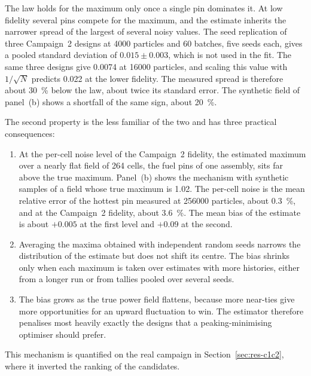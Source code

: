 The law holds for the maximum only once a single pin dominates it. At
low fidelity several pins compete for the maximum, and the estimate
inherits the narrower spread of the largest of several noisy values.
The seed replication of three Campaign~2 designs at \num{4000} particles
and 60 batches, five seeds each, gives a pooled standard deviation of
$0.015 \pm 0.003$, which is not used in the fit. The same three designs
give 0.0074 at \num{16000} particles, and scaling this value with
$1/\sqrt{N}$ predicts 0.022 at the lower fidelity. The measured spread is
therefore about \SI{30}{\percent} below the law, about twice its
standard error. The synthetic field of panel~(b) shows a shortfall of
the same sign, about \SI{20}{\percent}.

The second property is the less familiar of the two and has three
practical consequences:

\begin{enumerate}
  \item At the per-cell noise level of the Campaign~2 fidelity, the
        estimated maximum over a nearly flat field of 264 cells, the
        fuel pins of one assembly, sits far above the true maximum.
        Panel~(b) shows the mechanism with synthetic samples of a field
        whose true maximum is 1.02. The per-cell noise is the mean relative
        error of the hottest pin measured at \num{256000} particles,
        about \SI{0.3}{\percent}, and at the Campaign~2 fidelity, about
        \SI{3.6}{\percent}. The mean bias of the estimate is about
        $+0.005$ at the first level and $+0.09$ at the second.

  \item Averaging the maxima obtained with independent random seeds
        narrows the distribution of the estimate but does not shift its
        centre. The bias shrinks only when each maximum is taken over
        estimates with more histories, either from a longer run or from
        tallies pooled over several seeds.

  \item The bias grows as the true power field flattens, because more
        near-ties give more opportunities for an upward fluctuation to
        win. The estimator therefore penalises most heavily exactly the
        designs that a peaking-minimising optimiser should prefer.
\end{enumerate}

This mechanism is quantified on the real campaign in
Section~\ref{sec:res-c1c2}, where it inverted the ranking of the
candidates.

